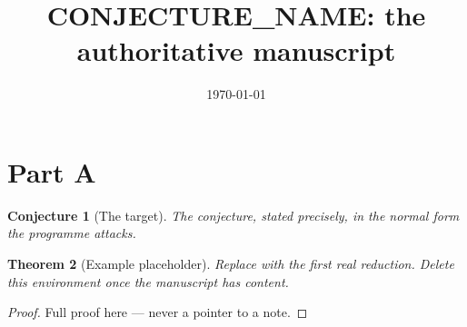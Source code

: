 \documentclass[11pt]{article}
\title{ {{CONJECTURE_NAME}}: the authoritative manuscript}
\author{}
\date{\today}
\newtheorem{theorem}{Theorem}[section]
\newtheorem{conjecture}[theorem]{Conjecture}
\begin{document}
\maketitle

\part{Part A}

\begin{conjecture}[The target]\label{conj:target}
{{The conjecture, stated precisely, in the normal form the programme
attacks.}}
\end{conjecture}

\begin{theorem}[Example placeholder]\label{thm:example}
{{Replace with the first real reduction. Delete this environment once the
manuscript has content.}}
\end{theorem}

\begin{proof}
{{Full proof here — never a pointer to a note.}}
\end{proof}
\end{document}
